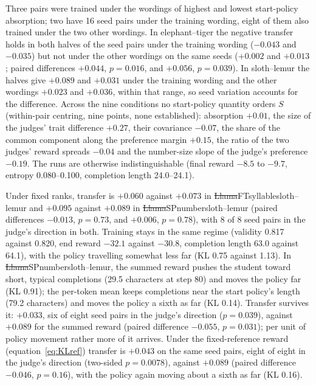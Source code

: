 Three  pairs were trained under the wordings of highest and lowest start-policy absorption; two have 16 seed pairs under the training wording, eight of them also trained under the two other wordings. In elephant--tiger the negative transfer holds in both halves of the seed pairs under the training wording ($-0.043$ and $-0.035$) but not under the other wordings on the same seeds ($+0.002$ and $+0.013$; paired differences $+0.044$, $p = 0.016$, and $+0.056$, $p = 0.039$). In sloth--lemur the halves give $+0.089$ and $+0.031$ under the training wording and the other wordings $+0.023$ and $+0.036$, within that range, so seed variation accounts for the difference. Across the nine conditions no start-policy quantity orders $S$ (within-pair centring, nine points, none established): absorption $+0.01$, the size of the judges' trait difference $+0.27$, their covariance $-0.07$, the share of the common component along the preference margin $+0.15$, the ratio of the two judges' reward spreads $-0.04$ and the number-size slope of the judge's preference $-0.19$. The runs are otherwise indistinguishable (final reward $-8.5$ to $-9.7$, entropy 0.080--0.100, completion length 24.0--24.1).

Under fixed ranks, transfer is $+0.060$ against $+0.073$ in \st{Llama}{FT}{syllable}{sloth--lemur} and $+0.095$ against $+0.089$ in \st{Llama}{SP}{number}{sloth--lemur} (paired differences $-0.013$, $p = 0.73$, and $+0.006$, $p = 0.78$), with 8 of 8 seed pairs in the judge's direction in both. Training stays in the same regime (validity 0.817 against 0.820, end reward $-32.1$ against $-30.8$, completion length 63.0 against 64.1), with the policy travelling somewhat less far (KL 0.75 against 1.13). In \st{Llama}{SP}{number}{sloth--lemur}, the summed reward pushes the student toward short, typical completions (29.5 characters at step 80) and moves the policy far (KL 0.91); the per-token mean keeps completions near the start policy's length (79.2 characters) and moves the policy a sixth as far (KL 0.14). Transfer survives it: $+0.033$, six of eight seed pairs in the judge's direction ($p = 0.039$), against $+0.089$ for the summed reward (paired difference $-0.055$, $p = 0.031$); per unit of policy movement rather more of it arrives. Under the fixed-reference reward (equation~\eqref{eq:KLref}) transfer is $+0.043$ on the same seed pairs, eight of eight in the judge's direction (two-sided $p = 0.0078$), against $+0.089$ (paired difference $-0.046$, $p = 0.16$), with the policy again moving about a sixth as far (KL 0.16).

